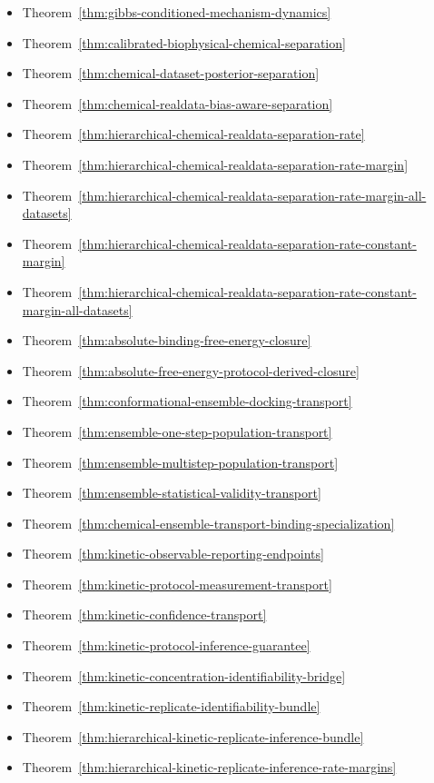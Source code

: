 \begin{itemize}
\item Theorem~\ref{thm:gibbs-conditioned-mechanism-dynamics}
\item Theorem~\ref{thm:calibrated-biophysical-chemical-separation}
\item Theorem~\ref{thm:chemical-dataset-posterior-separation}
\item Theorem~\ref{thm:chemical-realdata-bias-aware-separation}
\item Theorem~\ref{thm:hierarchical-chemical-realdata-separation-rate}
\item Theorem~\ref{thm:hierarchical-chemical-realdata-separation-rate-margin}
\item Theorem~\ref{thm:hierarchical-chemical-realdata-separation-rate-margin-all-datasets}
\item Theorem~\ref{thm:hierarchical-chemical-realdata-separation-rate-constant-margin}
\item Theorem~\ref{thm:hierarchical-chemical-realdata-separation-rate-constant-margin-all-datasets}
\item Theorem~\ref{thm:absolute-binding-free-energy-closure}
\item Theorem~\ref{thm:absolute-free-energy-protocol-derived-closure}
\item Theorem~\ref{thm:conformational-ensemble-docking-transport}
\item Theorem~\ref{thm:ensemble-one-step-population-transport}
\item Theorem~\ref{thm:ensemble-multistep-population-transport}
\item Theorem~\ref{thm:ensemble-statistical-validity-transport}
\item Theorem~\ref{thm:chemical-ensemble-transport-binding-specialization}
\item Theorem~\ref{thm:kinetic-observable-reporting-endpoints}
\item Theorem~\ref{thm:kinetic-protocol-measurement-transport}
\item Theorem~\ref{thm:kinetic-confidence-transport}
\item Theorem~\ref{thm:kinetic-protocol-inference-guarantee}
\item Theorem~\ref{thm:kinetic-concentration-identifiability-bridge}
\item Theorem~\ref{thm:kinetic-replicate-identifiability-bundle}
\item Theorem~\ref{thm:hierarchical-kinetic-replicate-inference-bundle}
\item Theorem~\ref{thm:hierarchical-kinetic-replicate-inference-rate-margins}

\end{itemize}
